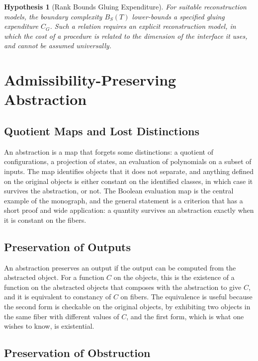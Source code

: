 \documentclass[11pt,letterpaper]{report}
\theoremstyle{plain}
\newtheorem{hypothesis}[theorem]{Hypothesis}
\theoremstyle{definition}
\theoremstyle{remark}
\begin{document}
\begin{hypothesis}[Rank Bounds Gluing Expenditure]\label{hy:rankgluing}
For suitable reconstruction models, the boundary complexity $B_S(T)$ lower-bounds a specified gluing expenditure $C_G$. Such a relation requires an explicit reconstruction model, in which the cost of a procedure is related to the dimension of the interface it uses, and cannot be assumed universally.
\end{hypothesis}

\chapter{Admissibility-Preserving Abstraction}

\section{Quotient Maps and Lost Distinctions}

An abstraction is a map that forgets some distinctions: a quotient of configurations, a projection of states, an evaluation of polynomials on a subset of inputs. The map identifies objects that it does not separate, and anything defined on the original objects is either constant on the identified classes, in which case it survives the abstraction, or not. The Boolean evaluation map is the central example of the monograph, and the general statement is a criterion that has a short proof and wide application: a quantity survives an abstraction exactly when it is constant on the fibers.

\section{Preservation of Outputs}

An abstraction preserves an output if the output can be computed from the abstracted object. For a function $C$ on the objects, this is the existence of a function on the abstracted objects that composes with the abstraction to give $C$, and it is equivalent to constancy of $C$ on fibers. The equivalence is useful because the second form is checkable on the original objects, by exhibiting two objects in the same fiber with different values of $C$, and the first form, which is what one wishes to know, is existential.

\section{Preservation of Obstruction}
\end{document}
